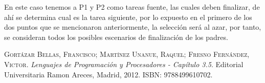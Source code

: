 \documentclass{article}
\begin{document}
En este caso tenemos a P1 y P2 como tareas fuente, las cuales deben finalizar,
de ah\'i se determina cual es la tarea siguiente, por lo expuesto en el primero
de los dos puntos que se mencionaron anteriormente, la selecci\'on ser\'a al azar,
por tanto, se consideran todos los posibles escenarios de finalizaci\'on de los padres.

\newpage
\begin{thebibliography}{99}
	\textsc{Gort\'azar Bellas, Francisco; Mart\'inez Unanue, Raquel; Fresno Fern\'andez, Victor}. \textit{Lenguajes de Programaci\'on y Procesadores - Cap\'itulo 3.5}. Editorial Universitaria Ramon Areces, Madrid, 2012. \textsc{ISBN: 9788499610702}.
\end{thebibliography}
\end{document}
